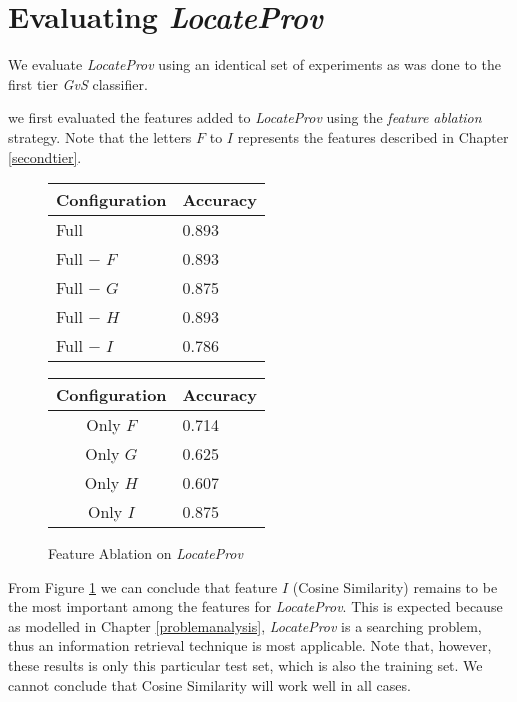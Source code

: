 \section{Evaluating {\it LocateProv}}
\label{eval:second}
We evaluate {\it LocateProv} using an identical set of experiments as was done to the first tier {\it GvS} classifier.

we first evaluated the features added to {\it LocateProv} using the {\it feature ablation} strategy. Note that the letters $F$ to $I$ represents the features described in Chapter \ref{secondtier}.

\begin{figure}[ht]
\begin{minipage}[b]{0.45\linewidth}\centering
\begin{tabular}{ l | l }
Configuration & Accuracy \\
\hline
Full			& 0.893 \\
Full $-$ $F$	& 0.893 \\
Full $-$ $G$	& 0.875 \\
Full $-$ $H$	& 0.893 \\
Full $-$ $I$	& 0.786 \\
\end{tabular}
\end{minipage}
\hspace{0.5cm}
\begin{minipage}[b]{0.45\linewidth}\centering
\begin{tabular}{ c | l }
Configuration & Accuracy \\
\hline
Only $F$	& 0.714 \\
Only $G$	& 0.625 \\
Only $H$	& 0.607 \\
Only $I$	& 0.875 \\
\end{tabular}
\end{minipage}
\caption{Feature Ablation on {\it LocateProv}}
\label{fig:ablation_second}
\end{figure}
From Figure \ref{fig:ablation_second} we can conclude that feature $I$ (Cosine Similarity) remains to be the most important among the features for {\it LocateProv}. This is expected because as modelled in Chapter \ref{problemanalysis}, {\it LocateProv} is a searching problem, thus an information retrieval technique is most applicable. 
Note that, however, these results is only this particular test set, which is also the training set. We cannot conclude that Cosine Similarity will work well in all cases.


